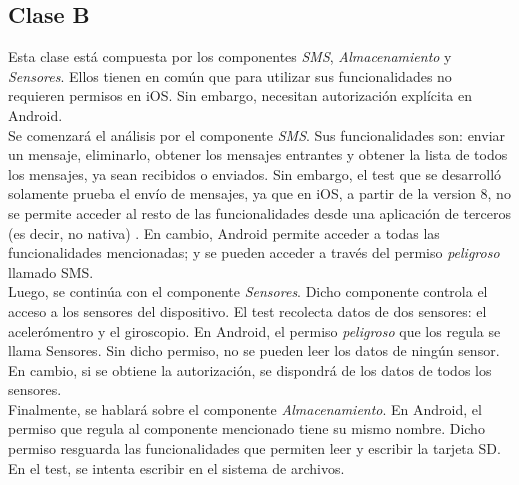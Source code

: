 \subsection{Clase B}
Esta clase está compuesta por los componentes \emph{SMS}, \emph{Almacenamiento} y \emph{Sensores}. Ellos tienen en común que para utilizar sus funcionalidades no requieren permisos en iOS. Sin embargo, necesitan autorización explícita en Android.\\
Se comenzará el análisis por el componente \emph{SMS}. Sus funcionalidades son: enviar un mensaje, eliminarlo, obtener los mensajes entrantes y obtener la lista de todos los mensajes, ya sean recibidos o enviados. Sin embargo, el test que se desarrolló solamente prueba el envío de mensajes, ya que en iOS, a partir de la version 8, no se permite acceder al resto de las funcionalidades desde una aplicación de terceros (es decir, no nativa) \cite{foda, foda2}. En cambio, Android permite acceder a todas las funcionalidades mencionadas; y se pueden acceder a través del permiso \textit{peligroso} llamado SMS.\\
Luego, se continúa con el componente \emph{Sensores}. Dicho componente controla el acceso a los sensores del dispositivo. El test recolecta datos de dos sensores: el acelerómentro y el giroscopio. En Android, el permiso \textit{peligroso} que los regula se llama Sensores. Sin dicho permiso, no se pueden leer los datos de ningún sensor. En cambio, si se obtiene la autorización, se dispondrá de los datos de todos los sensores.\\
Finalmente, se hablará sobre el componente \emph{Almacenamiento}. En Android, el permiso que regula al componente mencionado tiene su mismo nombre. Dicho permiso resguarda las funcionalidades que permiten leer y escribir la tarjeta SD. En el test, se intenta escribir en el sistema de archivos.
